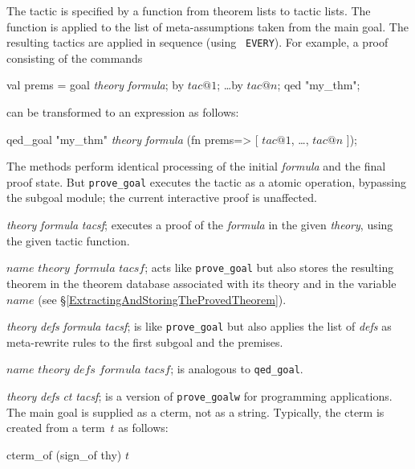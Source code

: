 The tactic is specified by a function from theorem lists to tactic lists.
The function is applied to the list of meta-assumptions taken from
the main goal.  The resulting tactics are applied in sequence (using {\tt
  EVERY}).  For example, a proof consisting of the commands
\begin{ttbox} 
val prems = goal {\it theory} {\it formula};
by \(tac@1\);  \ldots  by \(tac@n\);
qed "my_thm";
\end{ttbox}
can be transformed to an expression as follows:
\begin{ttbox} 
qed_goal "my_thm" {\it theory} {\it formula}
 (fn prems=> [ \(tac@1\), \ldots, \(tac@n\) ]);
\end{ttbox}
The methods perform identical processing of the initial {\it formula} and
the final proof state.  But \texttt{prove_goal} executes the tactic as a
atomic operation, bypassing the subgoal module; the current interactive
proof is unaffected.
%
\begin{ttdescription}
\item[\ttindexbold{prove_goal} {\it theory} {\it formula} {\it tacsf};] 
executes a proof of the {\it formula\/} in the given {\it theory}, using
the given tactic function.

\item[\ttindexbold{qed_goal} $name$ $theory$ $formula$ $tacsf$;] acts
  like \texttt{prove_goal} but also stores the resulting theorem in the
  theorem database associated with its theory and in the {\ML}
  variable $name$ (see \S\ref{ExtractingAndStoringTheProvedTheorem}).

\item[\ttindexbold{prove_goalw} {\it theory} {\it defs} {\it formula} 
      {\it tacsf};]
is like \texttt{prove_goal} but also applies the list of {\it defs\/} as
meta-rewrite rules to the first subgoal and the premises.

\item[\ttindexbold{qed_goalw} $name$ $theory$ $defs$ $formula$ $tacsf$;]
is analogous to \texttt{qed_goal}.

\item[\ttindexbold{prove_goalw_cterm} {\it theory} {\it defs} {\it ct}
      {\it tacsf};] 
is a version of \texttt{prove_goalw} for programming applications.  The main
goal is supplied as a cterm, not as a string.  Typically, the cterm is
created from a term~$t$ as follows:
\begin{ttbox}
cterm_of (sign_of thy) \(t\)
\end{ttbox}
\end{ttdescription}


